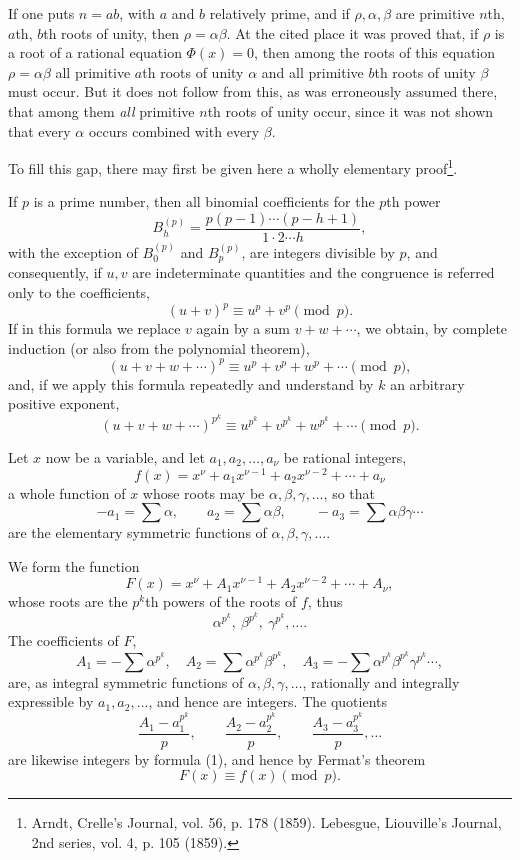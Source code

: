 \documentclass[11pt]{article}
\begin{document}
If one puts $n=ab$, with $a$ and $b$ relatively prime, and if $\rho,\alpha,\beta$ are primitive $n$th, $a$th, $b$th roots of unity, then $\rho=\alpha\beta$. At the cited place it was proved that, if $\rho$ is a root of a rational equation $\Phi(x)=0$, then among the roots of this equation $\rho=\alpha\beta$ all primitive $a$th roots of unity $\alpha$ and all primitive $b$th roots of unity $\beta$ must occur. But it does not follow from this, as was erroneously assumed there, that among them \emph{all} primitive $n$th roots of unity occur, since it was not shown that every $\alpha$ occurs combined with every $\beta$.

To fill this gap, there may first be given here a wholly elementary proof\footnote{Arndt, Crelle's Journal, vol. 56, p. 178 (1859). Lebesgue, Liouville's Journal, 2nd series, vol. 4, p. 105 (1859).}.

If $p$ is a prime number, then all binomial coefficients for the $p$th power
\[
B_h^{(p)}=\frac{p(p-1)\cdots(p-h+1)}{1\cdot2\cdots h},
\]
with the exception of $B_0^{(p)}$ and $B_p^{(p)}$, are integers divisible by $p$,
and consequently, if $u,v$ are indeterminate quantities and the congruence is referred only to the coefficients,
\[
(u+v)^p\equiv u^p+v^p \pmod p.
\]
If in this formula we replace $v$ again by a sum $v+w+\cdots$, we obtain, by complete induction (or also from the polynomial theorem),
\[
(u+v+w+\cdots)^p\equiv u^p+v^p+w^p+\cdots \pmod p,
\]
and, if we apply this formula repeatedly and understand by $k$ an arbitrary positive exponent,
\begin{equation}\tag{1}
(u+v+w+\cdots)^{p^k}\equiv u^{p^k}+v^{p^k}+w^{p^k}+\cdots \pmod p.
\end{equation}

Let $x$ now be a variable, and let $a_1,a_2,\ldots,a_\nu$ be rational integers,
\[
f(x)=x^\nu+a_1x^{\nu-1}+a_2x^{\nu-2}+\cdots+a_\nu
\]
a whole function of $x$ whose roots may be $\alpha,\beta,\gamma,\ldots$, so that
\[
-a_1=\sum\alpha,\qquad a_2=\sum\alpha\beta,\qquad -a_3=\sum\alpha\beta\gamma\cdots
\]
are the elementary symmetric functions of $\alpha,\beta,\gamma,\ldots$.

We form the function
\[
F(x)=x^\nu+A_1x^{\nu-1}+A_2x^{\nu-2}+\cdots+A_\nu,
\]
whose roots are the $p^k$th powers of the roots of $f$, thus
\[
\alpha^{p^k},\ \beta^{p^k},\ \gamma^{p^k},\ldots .
\]
The coefficients of $F$,
\[
A_1=-\sum\alpha^{p^k},\quad
A_2=\sum\alpha^{p^k}\beta^{p^k},\quad
A_3=-\sum\alpha^{p^k}\beta^{p^k}\gamma^{p^k}\cdots,
\]
are, as integral symmetric functions of $\alpha,\beta,\gamma,\ldots$, rationally and integrally expressible by $a_1,a_2,\ldots$, and hence are integers. The quotients
\[
\frac{A_1-a_1^{p^k}}{p},\qquad
\frac{A_2-a_2^{p^k}}{p},\qquad
\frac{A_3-a_3^{p^k}}{p},\ldots
\]
are likewise integers by formula (1), and hence by Fermat's theorem
\begin{equation}\tag{2}
F(x)\equiv f(x) \pmod p.
\end{equation}
\end{document}
